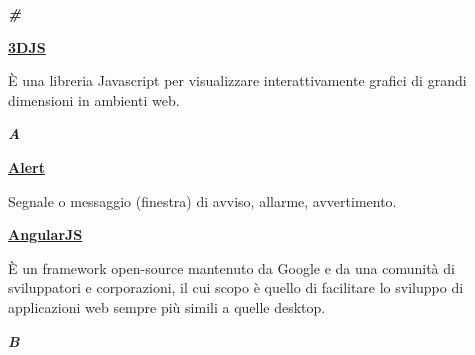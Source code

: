 \cleardoublepage
{}
{}
\noindent\hrulefill\hspace{4mm}\textbf{\textsl{\Huge{\#}}}\hspace{4mm}\hrulefill

\vspace*{2\bigskipamount}

\begin{addmargin}[0em]{0em}	
	\textbf{\underline{3DJS}} 
\end{addmargin}
	
\medskip
\begin{addmargin}[5em]{1em}	
È una libreria Javascript per visualizzare interattivamente grafici di grandi dimensioni in ambienti web.
\end{addmargin}

\newpage

\cleardoublepage
{}
{}
\noindent\hrulefill\hspace{4mm}\textbf{\textsl{\Huge{A}}}\hspace{4mm}\hrulefill

\vspace*{2\bigskipamount}

\begin{addmargin}[0em]{0em}
	\textbf{\underline{Alert}} 
\end{addmargin}
	
\medskip
\begin{addmargin}[5em]{1em}
Segnale o messaggio (finestra) di avviso, allarme, avvertimento.
\end{addmargin}

\bigskip
\begin{addmargin}[0em]{0em}
	\textbf{\underline{AngularJS}} 
\end{addmargin}
	
\medskip
\begin{addmargin}[5em]{1em}
È un framework open-source mantenuto da Google e da una comunità di sviluppatori e corporazioni, il cui scopo è quello di facilitare lo sviluppo di applicazioni web sempre più simili a quelle desktop.
\end{addmargin}

\newpage

\cleardoublepage
{}
{}
\noindent\hrulefill\hspace{4mm}\textbf{\textsl{\Huge{B}}}\hspace{4mm}\hrulefill

